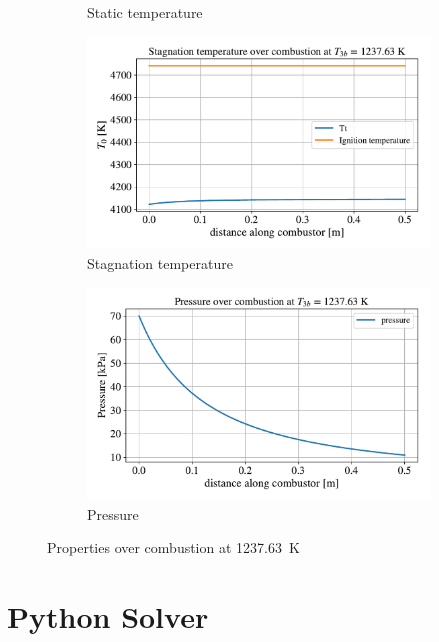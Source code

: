 \documentclass[a4paper]{article}
\begin{document}
\begin{figure}[H]
\begin{subfigure}[h]{0.49\linewidth}
        \caption{Static temperature}
        \label{subfig:temp_1238}
    \end{subfigure}
    \begin{subfigure}[h]{0.49\linewidth}
        \includegraphics[width=\linewidth]{part_2_img/stag_temp_1238.pdf}
        \caption{Stagnation temperature}
        \label{subfig:stag_temp_1238}
    \end{subfigure}
     \begin{subfigure}[h]{0.49\linewidth}
        \includegraphics[width=\linewidth]{part_2_img/pressure_1238.pdf}
        \caption{Pressure}
        \label{subfig:pressure_1238}
    \end{subfigure}
    \caption{Properties over combustion at 1237.63~K}
    \label{fig:properties_1238}
\end{figure}

\newpage
\section{Python Solver}\label{app:code}
\inputminted{python}{code/part2IncludingN2.py}
\end{document}
